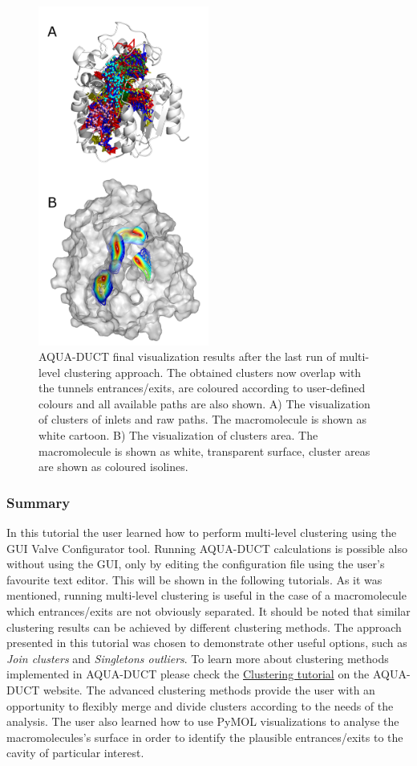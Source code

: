 \documentclass[9pt,tutorial, pubversion]{livecoms}
\begin{document}
\begin{figure}[ht!]
\centering
\includegraphics[width=0.5\textwidth]{Tut2.4.png}
\caption{AQUA-DUCT final visualization results after the last run of multi-level clustering approach. The obtained clusters now overlap with the tunnels entrances/exits, are coloured according to user-defined colours and all available paths are also shown. A) The visualization of clusters of inlets and raw paths. The macromolecule is shown as white cartoon. B) The visualization of clusters area. The macromolecule is shown as white, transparent surface, cluster areas are shown as coloured isolines.}
\label{Tut2.4}
\end{figure}

\subsubsection{Summary}
In this tutorial the user learned how to perform multi-level clustering using the GUI Valve Configurator tool. Running AQUA-DUCT calculations is possible also without using the GUI, only by editing the configuration file using the user's favourite text editor. This will be shown in the following tutorials. As it was mentioned, running multi-level clustering is useful in the case of a macromolecule which entrances/exits are not obviously separated. It should be noted that similar clustering results can be achieved by different clustering methods. The approach presented in this tutorial was chosen to demonstrate other useful options, such as \textit{Join clusters} and \textit{Singletons outliers}. To learn more about clustering methods implemented in AQUA-DUCT please check the \href{http://www.aquaduct.pl/clustering/}{Clustering tutorial} on the AQUA-DUCT website. The advanced clustering methods provide the user with an opportunity to flexibly merge and divide clusters according to the needs of the analysis. The user also learned how to use PyMOL visualizations to analyse the macromolecules's surface in order to identify the plausible entrances/exits to the cavity of particular interest.
\end{document}
